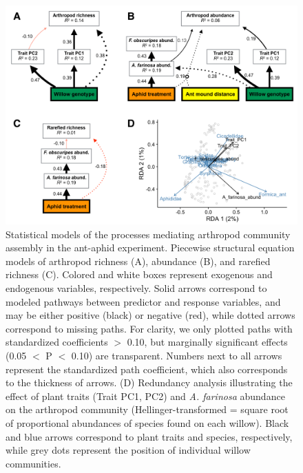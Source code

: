\documentclass[11pt]{article}
\begin{document}
\begin{figure}%
\centering
\includegraphics[scale = 0.45]{image04.png}
\caption{Statistical models of the processes mediating
arthropod community assembly in the ant-aphid experiment. Piecewise
structural equation models of arthropod richness (A), abundance (B), and
rarefied richness (C). Colored and white boxes represent exogenous and
endogenous variables, respectively. Solid arrows
correspond to modeled pathways between predictor and response variables,
and may be either positive (black) or negative (red), while dotted arrows correspond to missing paths. For clarity,
we only plotted paths with standardized coefficients $>$
0.10, but marginally significant effects (0.05 $<$ P $<$ 0.10) are transparent. Numbers next to all arrows represent the standardized path
coefficient, which also corresponds to the thickness of arrows. (D)
Redundancy analysis illustrating the effect of plant traits (Trait PC1, PC2) and \textit{A. farinosa} abundance on the arthropod community (Hellinger-transformed = square root of proportional abundances of species found on each willow).
Black and blue arrows correspond to plant traits and species,
respectively, while grey dots represent the position of individual
willow communities.}
\label{aaSEM}
\end{figure}
\end{document}
